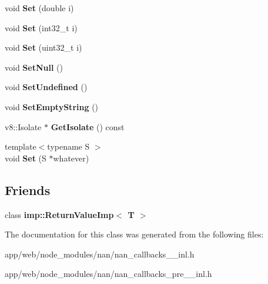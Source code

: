 \begin{DoxyCompactItemize}
\item 
\mbox{\label{class_return_value_acbf15a008ec49552698a0aa92d4d59a6}} 
void {\bfseries Set} (double i)
\item 
\mbox{\label{class_return_value_ab98f791742444327656f207dcc430f1e}} 
void {\bfseries Set} (int32\+\_\+t i)
\item 
\mbox{\label{class_return_value_a2cab3e0dfa8d260d14ed44b7f92f356b}} 
void {\bfseries Set} (uint32\+\_\+t i)
\item 
\mbox{\label{class_return_value_a812f2968e323bb9315c37d727973cbdc}} 
void {\bfseries Set\+Null} ()
\item 
\mbox{\label{class_return_value_a39857f0a5e06b05a7d9dc92db992826e}} 
void {\bfseries Set\+Undefined} ()
\item 
\mbox{\label{class_return_value_a0b226fddc9e78d3df5e9e1e1eb8fa4bc}} 
void {\bfseries Set\+Empty\+String} ()
\item 
\mbox{\label{class_return_value_a8400056fd48b2093f44a8856001c7733}} 
v8\+::\+Isolate $\ast$ {\bfseries Get\+Isolate} () const
\item 
\mbox{\label{class_return_value_a20d0ac2c7b9c4b78a5aa008a05f86cdd}} 
{\footnotesize template$<$typename S $>$ }\\void {\bfseries Set} (S $\ast$whatever)
\end{DoxyCompactItemize}
\subsection*{Friends}
\begin{DoxyCompactItemize}
\item 
\mbox{\label{class_return_value_a916b17659a798dd2aa88262b08f09a67}} 
class {\bfseries imp\+::\+Return\+Value\+Imp$<$ T $>$}
\end{DoxyCompactItemize}


The documentation for this class was generated from the following files\+:\begin{DoxyCompactItemize}
\item 
app/web/node\+\_\+modules/nan/nan\+\_\+callbacks\+\_\+\_\+inl.\+h\item 
app/web/node\+\_\+modules/nan/nan\+\_\+callbacks\+\_\+pre\+\_\+\_\+inl.\+h\end{DoxyCompactItemize}
